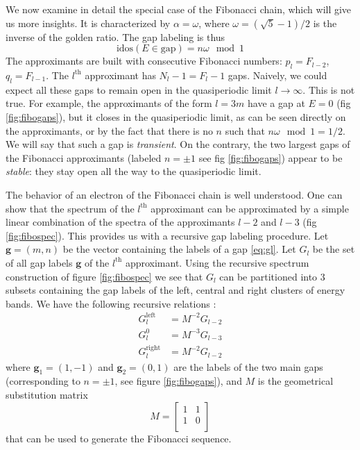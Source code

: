 \documentclass[a4paper]{jpconf}
\newcommand{\gv}{\ensuremath{\mathbf{g}}}
\newcommand{\sub}{\ensuremath{M}}
\newcommand{\id}{\ensuremath{\text{idos}}}
\begin{document}
We now examine in detail the special case of the Fibonacci chain, which will give us more insights.
It is characterized by $\alpha = \omega$, where $\omega = (\sqrt{5}-1)/2$ is the inverse of the golden ratio.
The gap labeling is thus
\begin{equation}
	\label{eq:fibogaps}
	\id(E \in \text{gap}) = n \omega \mod 1
\end{equation}
The approximants are built with consecutive Fibonacci numbers: $p_l = F_{l-2}$, $q_l = F_{l-1}$.
The $l^\text{th}$ approximant has $N_l-1 = F_l -1$ gaps.
Naively, we could expect all these gaps to remain open in the quasiperiodic limit $l \to \infty$.
This is not true. 
For example, the approximants of the form $l = 3m$ have a gap at $E=0$ (fig \eqref{fig:fibogaps}), but it closes in the quasiperiodic limit, as can be seen directly on the approximants, or by the fact that there is no $n$ such that $n \omega \mod 1 = 1/2$.
We will say that such a gap is \emph{transient}.
On the contrary, the two largest gaps of the Fibonacci approximants (labeled $n = \pm 1$ see fig \eqref{fig:fibogaps}) appear to be \emph{stable}: they stay open all the way to the quasiperiodic limit.

The behavior of an electron of the Fibonacci chain is well understood. 
One can show \cite{Niu90, Piechon95} that the spectrum of the $l^\text{th}$ approximant can be approximated by a simple linear combination of the spectra of the approximants $l-2$ and $l-3$ (fig \eqref{fig:fibospec}).
This provides us with a recursive gap labeling procedure. 
Let $\gv = (m, n)$ be the vector containing the labels of a gap \eqref{eq:gl}.
Let $G_l$ be the set of all gap labels $\gv$ of the $l^\text{th}$ approximant.
Using the recursive spectrum construction of figure \eqref{fig:fibospec} we see that $G_l$ can be partitioned into 3 subsets containing the gap labels of the left, central and right clusters of energy bands.
We have the following recursive relations \cite{fiboperturbMace}:
\begin{align}
	G_{l}^{\text{left}} &= \sub^{-2} G_{l-2} \\
	G_{l}^0 &= \sub^{-3} G_{l-3} \\
	G_{l}^\text{right} &= \sub^{-2} G_{l-2}
\end{align}
where $\gv_1 = (1, -1)$ and $\gv_2 = (0, 1)$ are the labels of the two main gaps (corresponding to $n = \pm 1$, see figure \eqref{fig:fibogaps}),
and $\sub$ is the geometrical substitution matrix
\begin{equation}
	\sub = 
	\begin{bmatrix}
		1 & 1\\
		1 & 0\\
	\end{bmatrix}
\end{equation}
that can be used to generate the Fibonacci sequence.
\end{document}
